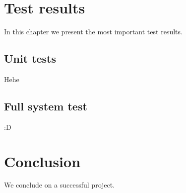 \chapter{Test results}
In this chapter we present the most important test results.\\
\section{Unit tests}
Hehe

\section{Full system test}
:D




\chapter{Conclusion}
We conclude on a successful project.


